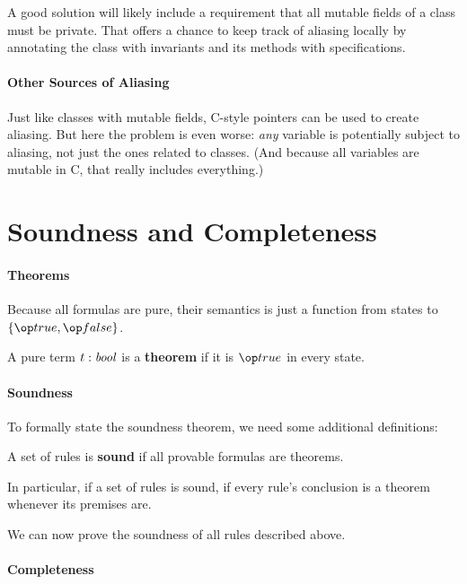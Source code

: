 A good solution will likely include a requirement that all mutable fields of a class must be private.
That offers a chance to keep track of aliasing locally by annotating the class with invariants and its methods with specifications.

\paragraph{Other Sources of Aliasing}
Just like classes with mutable fields, C-style pointers can be used to create aliasing.
But here the problem is even worse: \emph{any} variable is potentially subject to aliasing, not just the ones related to classes.
(And because all variables are mutable in C, that really includes everything.)

\section{Soundness and Completeness}

\paragraph{Theorems}
Because all formulas are pure, their semantics is just a function from states to $\{\true,\false\}$.

\begin{definition}[Theorem]
A pure term $t:\mathit{bool}$ is a \textbf{theorem} if it is $\true$ in every state.
\end{definition}


\paragraph{Soundness}
To formally state the soundness theorem, we need some additional definitions:

\begin{definition}[Soundness]
A set of rules is \textbf{sound} if all provable formulas are theorems.
\end{definition}

In particular, if a set of rules is sound, if every rule's conclusion is a theorem whenever its premises are.

We can now prove the soundness of all rules described above.

\paragraph{Completeness}

